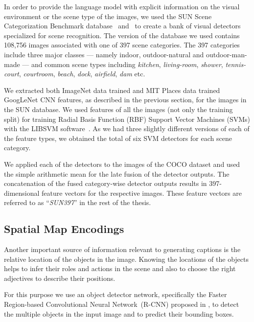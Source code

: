 In order to provide the language model with explicit information on the visual
environment or the scene type of the images, we used the SUN Scene
Categorization Benchmark database~\cite{Xiao2010} and~\cite{Xiao2014} to create
a bank of visual detectors specialized for scene recognition.
The version of the database we used contains 108,756 images associated with one
of 397 scene categories.
The 397 categories include three major classes --- namely indoor, outdoor-natural
and outdoor-man-made --- and common scene types including \emph{kitchen},
\emph{living-room}, \emph{shower}, \emph{tennis-court}, \emph{courtroom},
\emph{beach}, \emph{dock}, \emph{airfield}, \emph{dam} etc. 

We extracted both ImageNet data trained and MIT Places data trained GoogLeNet
CNN features, as described in the previous section, for the images in the SUN
database.
We used features of all the images (not only the training split) for
training Radial Basis Function (RBF) Support Vector Machines (SVMs) with the
LIBSVM software~\cite{LIBSVM}.
As we had three slightly different versions of each of the feature types, we
obtained the total of six SVM detectors for each scene category.

We applied each of the detectors to the images of the COCO dataset and used the
simple arithmetic mean for the late fusion of the detector outputs.
The concatenation of the fused category-wise detector outputs results in
397-dimensional feature vectors for the respective images.
These feature vectors are referred to as ``\emph{SUN397}'' in the rest of the
thesis.

\subsection{Spatial Map Encodings}
\label{sec:frcnnfeat}
Another important source of information relevant to generating captions is the
relative location of the objects in the image. 
Knowing the locations of the objects helps to infer their roles and actions in
the scene and also to choose the right adjectives to describe their positions.

For this purpose we use an object detector network, specifically the Faster
Region-based Convolutional Neural Network~(R-CNN) proposed in
\cite{ren15fasterrcnn}, to detect the multiple objects in the input image and to
predict their bounding boxes.

